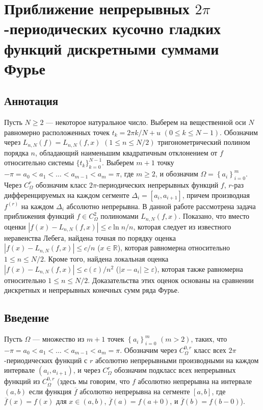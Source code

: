 \section{Приближение непрерывных $2\pi$-периодических кусочно гладких функций дискретными суммами Фурье}

\subsection{Аннотация}
Пусть $N \geq 2$ --- некоторое натуральное число. Выберем на вещественной оси $N$ равномерно расположенных точек $t_k=2\pi k / N + u$ $(0 \leq k \leq N-1)$.
Обозначим через $L_{n,N}(f)=L_{n,N}(f,x)$ $(1\leq n\leq N/2)$ тригонометрический полином порядка $n$, обладающий наименьшим квадратичным отклонением от $f$ относительно системы $\{t_k\}_{k=0}^{N-1}$. Выберем $m+1$ точку $-\pi=a_{0}<a_{1}<\ldots<a_{m-1}<a_{m}=\pi$, где $m\geq 2$, и обозначим $\Omega=\left\{a_i\right\}_{i=0}^{m}$. Через $C_{\Omega}^{r}$ обозначим класс $2\pi$-периодических непрерывных функций $f$, $r$-раз дифференцируемых на каждом сегменте  $\Delta_{i}=[a_{i},a_{i+1}]$, причем 
производная $f^{(r)}$ на каждом $\Delta_{i}$ абсолютно непрерывна.
В данной работе рассмотрена задача приближения функций $f\in C_{\Omega}^{2}$ полиномами $L_{n,N}(f,x)$.
Показано, что вместо оценки $\left|f(x)-L_{n,N}(f,x)\right| \leq c\ln n/n$, которая следует из известного неравенства Лебега, найдена точная по порядку оценка $\left|f(x)-L_{n,N}(f,x)\right| \leq c/n$ ($x \in \mathbb{R}$), которая равномерна относительно $1 \leq n \leq N/2$.
Кроме того, найдена локальная оценка $\left|f(x)-L_{n,N}(f,x)\right| \leq c(\varepsilon)/n^2$ ($\left|x - a_i\right| \geq \varepsilon$), которая также равномерна относительно $1 \leq n \leq N/2$.
Доказательства этих оценок основаны на сравнении дискретных и непрерывных конечных сумм ряда Фурье.

\subsection{Введение}
Пусть $\Omega$ --- множество из $m+1$ точек $\left\{ a_{i}\right\} _{i=0}^{m}$ $(m > 2)$, таких, что $-\pi=a_{0}<a_{1}<\ldots<a_{m-1}<a_{m}=\pi$.
Обозначим через $C_\Omega^{0,r}$ класс всех $2\pi$-периодических функций с $r$ абсолютно непрерывными производными на каждом интервале $(a_i, a_{i+1})$,
и через $C_\Omega^{r}$ обозначим подкласс всех непрерывных функций из $C_\Omega^{0,r}$ (здесь мы говорим, что $f$ абсолютно непрерывна на интервале $(a,b)$ 
если функция $\overline{f}$ абсолютно непрерывна на сегменте $[a,b]$, где $\overline{f}(x) = f(x)$ для $x \in (a,b)$, $\overline{f}(a) = f(a+0)$, и $\overline{f}(b) = f(b-0)$). 

